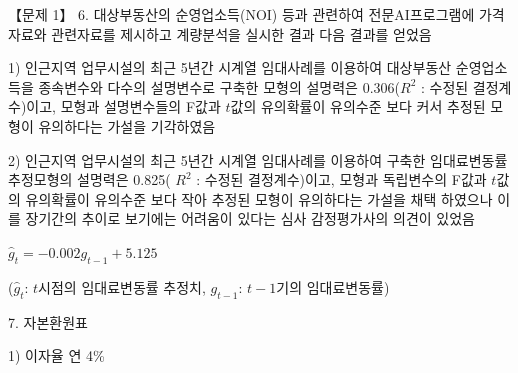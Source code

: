 \begin{longquestion}{【문제 1】}
6. 대상부동산의 순영업소득(NOI) 등과 관련하여 전문AI프로그램에 가격자료와 관련자료를 제시하고 계량분석을 실시한 결과 다음 결과를 얻었음 \par
1) 인근지역 업무시설의 최근 5년간 시계열 임대사례를 이용하여 대상부동산 순영업소득을 종속변수와 다수의 설명변수로 구축한 모형의 설명력은 0.306($R^{2}$ : 수정된 결정계수)이고, 모형과 설명변수들의 F값과 $t$값의 유의확률이 유의수준 보다 커서 추정된 모형이 유의하다는 가설을 기각하였음 \par
2) 인근지역 업무시설의 최근 5년간 시계열 임대사례를 이용하여 구축한 임대료변동률 추정모형의 설명력은 0.825( $R^{2}$ : 수정된 결정계수)이고, 모형과 독립변수의 F값과 $t$값의 유의확률이 유의수준 보다 작아 추정된 모형이 유의하다는 가설을 채택 하였으나 이를 장기간의 추이로 보기에는 어려움이 있다는 심사 감정평가사의 의견이 있었음 \par
$\hat{g}_{t}=-0.002g_{t-1}+5.125$ \par
($\hat{g}_{t}$: $t$시점의 임대료변동률 추정치, $g_{t-1}$: $t-1$기의 임대료변동률) \par
7. 자본환원표 \par
1) 이자율 연 4\% \par
{\small\centering
{}\par}


\end{longquestion}

